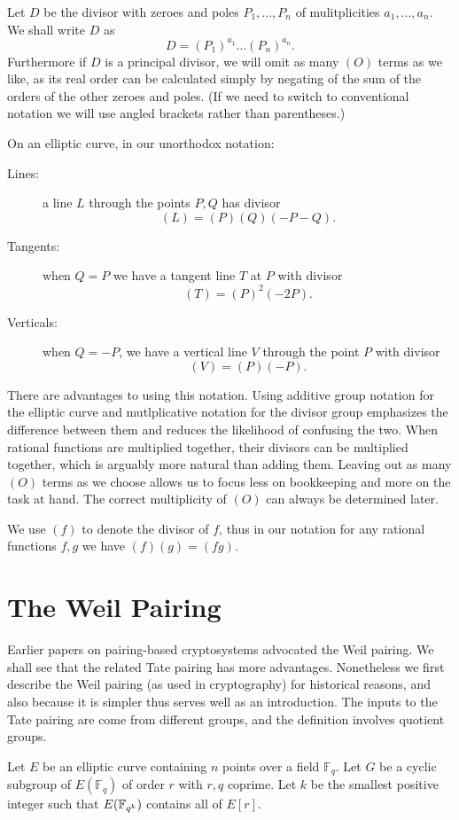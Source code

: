 Let $D$ be the divisor with zeroes and poles $P_1,...,P_n$
of mulitplicities $a_1,...,a_n$.
We shall write $D$ as
\[ D = (P_1)^{a_1} ... (P_n)^{a_n} . \]
Furthermore if $D$ is a principal divisor, we will
omit as many $(O)$ terms as we like, as its real order
can be calculated simply by negating
of the sum of the orders of the other zeroes and poles.
(If we need to switch to conventional notation we will use angled brackets
rather than parentheses.)

On an elliptic curve, in our unorthodox notation:
\begin{description}
\item[Lines:]
a line $L$ through the points $P, Q$ has divisor
\[ (L) = (P)(Q)(-P-Q) . \]
\item[Tangents:]
when $Q = P$ we have a tangent line $T$ at $P$ with divisor
\[ (T) = (P)^2 (-2P) . \]
\item[Verticals:]
when $Q = -P$, we have a vertical line $V$ through the point $P$
with divisor
\[ (V) = (P)(-P) . \]
\end{description}

There are advantages to using this notation. Using additive group
notation for the elliptic curve and mutlplicative notation for the divisor
group emphasizes the difference between them and reduces the likelihood of
confusing the two. When rational functions are multiplied together,
their divisors can be multiplied together, which is arguably
more natural than adding them.
Leaving out as many $(O)$ terms as we choose allows us to focus less on
bookkeeping and more on the task at hand.
The correct multiplicity of $(O)$ can always be determined later.

We use
$(f)$ to denote the divisor of $f$, thus in our notation
for any rational functions $f, g$ we have $(f)(g) = (f g)$.

\section {The Weil Pairing}

Earlier papers on pairing-based cryptosystems advocated the Weil pairing.
We shall see that the related Tate pairing has more advantages.
Nonetheless we first describe the Weil pairing (as used in cryptography)
for historical reasons, and also because it is simpler thus
serves well as an introduction. The inputs to the Tate pairing are come
from different groups, and the definition involves quotient groups.

Let $E$ be an elliptic curve containing $n$ points over a field $\mathbb{F}_q$.
Let $G$ be a cyclic subgroup of $E(\mathbb{F}_q)$ of order $r$ with $r, q$
coprime. Let $k$ be the smallest positive integer such that $E(\mathbb{F}_{q^k})$
contains all of $E[r]$.


